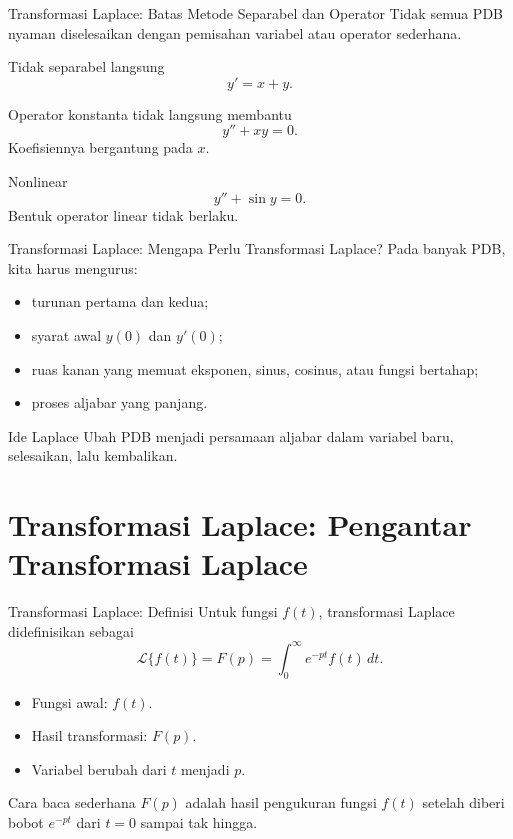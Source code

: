 \documentclass[aspectratio=169,11pt]{beamer}
\newcommand{\Lap}{\mathcal{L}}
\begin{document}
\begin{frame}{Transformasi Laplace: Batas Metode Separabel dan Operator}
Tidak semua PDB nyaman diselesaikan dengan pemisahan variabel atau operator sederhana.
\begin{exampleblock}{Tidak separabel langsung}
\[
y'=x+y.
\]
\end{exampleblock}
\begin{exampleblock}{Operator konstanta tidak langsung membantu}
\[
y''+xy=0.
\]
Koefisiennya bergantung pada $x$.
\end{exampleblock}
\begin{exampleblock}{Nonlinear}
\[
y''+\sin y=0.
\]
Bentuk operator linear tidak berlaku.
\end{exampleblock}
\end{frame}

\begin{frame}{Transformasi Laplace: Mengapa Perlu Transformasi Laplace?}
Pada banyak PDB, kita harus mengurus:
\begin{itemize}
  \item turunan pertama dan kedua;
  \item syarat awal $y(0)$ dan $y'(0)$;
  \item ruas kanan yang memuat eksponen, sinus, cosinus, atau fungsi bertahap;
  \item proses aljabar yang panjang.
\end{itemize}
\begin{block}{Ide Laplace}
Ubah PDB menjadi persamaan aljabar dalam variabel baru, selesaikan, lalu kembalikan.
\end{block}
\end{frame}

\section{Transformasi Laplace: Pengantar Transformasi Laplace}

\begin{frame}{Transformasi Laplace: Definisi}
Untuk fungsi $f(t)$, transformasi Laplace didefinisikan sebagai
\[
\boxed{\Lap\{f(t)\}=F(p)=\int_0^{\infty} e^{-pt}f(t)\,dt.}
\]
\begin{itemize}
  \item Fungsi awal: $f(t)$.
  \item Hasil transformasi: $F(p)$.
  \item Variabel berubah dari $t$ menjadi $p$.
\end{itemize}
\begin{alertblock}{Cara baca sederhana}
$F(p)$ adalah hasil pengukuran fungsi $f(t)$ setelah diberi bobot $e^{-pt}$ dari $t=0$ sampai tak hingga.
\end{alertblock}
\end{frame}
\end{document}
